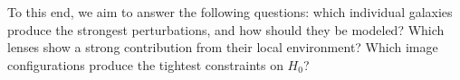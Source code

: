 To this end, we aim to answer the following questions: which individual galaxies produce the strongest perturbations, and how should they be modeled? Which lenses show a strong contribution from their local environment? Which image configurations produce the tightest constraints on $H_0$?